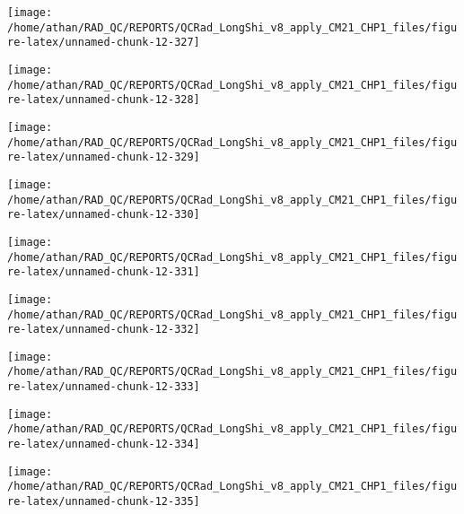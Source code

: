 \documentclass[
  10pt,
  a4paper,oneside]{article}
\begin{document}
\begin{center}\texttt{[image: /home/athan/RAD\_QC/REPORTS/QCRad\_LongShi\_v8\_apply\_CM21\_CHP1\_files/figure-latex/unnamed-chunk-12-327]} \end{center}

\begin{center}\texttt{[image: /home/athan/RAD\_QC/REPORTS/QCRad\_LongShi\_v8\_apply\_CM21\_CHP1\_files/figure-latex/unnamed-chunk-12-328]} \end{center}

\begin{center}\texttt{[image: /home/athan/RAD\_QC/REPORTS/QCRad\_LongShi\_v8\_apply\_CM21\_CHP1\_files/figure-latex/unnamed-chunk-12-329]} \end{center}

\begin{center}\texttt{[image: /home/athan/RAD\_QC/REPORTS/QCRad\_LongShi\_v8\_apply\_CM21\_CHP1\_files/figure-latex/unnamed-chunk-12-330]} \end{center}

\begin{center}\texttt{[image: /home/athan/RAD\_QC/REPORTS/QCRad\_LongShi\_v8\_apply\_CM21\_CHP1\_files/figure-latex/unnamed-chunk-12-331]} \end{center}

\begin{center}\texttt{[image: /home/athan/RAD\_QC/REPORTS/QCRad\_LongShi\_v8\_apply\_CM21\_CHP1\_files/figure-latex/unnamed-chunk-12-332]} \end{center}

\begin{center}\texttt{[image: /home/athan/RAD\_QC/REPORTS/QCRad\_LongShi\_v8\_apply\_CM21\_CHP1\_files/figure-latex/unnamed-chunk-12-333]} \end{center}

\begin{center}\texttt{[image: /home/athan/RAD\_QC/REPORTS/QCRad\_LongShi\_v8\_apply\_CM21\_CHP1\_files/figure-latex/unnamed-chunk-12-334]} \end{center}

\begin{center}\texttt{[image: /home/athan/RAD\_QC/REPORTS/QCRad\_LongShi\_v8\_apply\_CM21\_CHP1\_files/figure-latex/unnamed-chunk-12-335]} \end{center}
\end{document}
